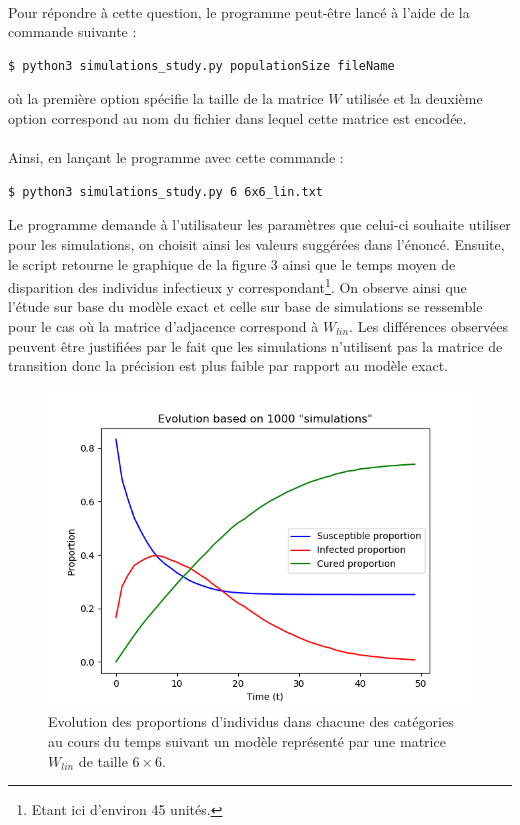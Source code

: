 \documentclass[a4paper, 12pt, oneside]{article}
\begin{document}
\paragraph{}Pour répondre à cette question, le programme peut-être lancé à l'aide de la commande suivante :
\begin{lstlisting}[language=bash]
$ python3 simulations_study.py populationSize fileName 
\end{lstlisting}
\noindent où la première option spécifie la taille de la matrice $W$ utilisée et la deuxième option correspond au nom du fichier dans lequel cette matrice est encodée.

\paragraph{}Ainsi, en lançant le programme avec cette commande :

\begin{lstlisting}[language=bash]
$ python3 simulations_study.py 6 6x6_lin.txt 
\end{lstlisting}

\noindent Le programme demande à l'utilisateur les paramètres que celui-ci souhaite utiliser pour les simulations, on choisit ainsi les valeurs suggérées dans l'énoncé. Ensuite, le script retourne le graphique de la figure 3 ainsi que le temps moyen de disparition des individus infectieux y correspondant\footnote{Etant ici d'environ 45 unités.}. On observe ainsi que l'étude sur base du modèle exact et celle sur base de simulations se ressemble pour le cas où la matrice d'adjacence correspond à $W_{lin}$. Les différences observées peuvent être justifiées par le fait que les simulations n'utilisent pas la matrice de transition donc la précision est plus faible par rapport au modèle exact.

\begin{figure}[H]
	\centering
	\includegraphics[scale=1]{lin_6x6_simulations.png} 
	\caption{Evolution des proportions d'individus dans chacune des catégories au cours du temps suivant un modèle représenté par une matrice $W_{lin}$ de taille $6 \times 6$.}
\end{figure}
\end{document}
